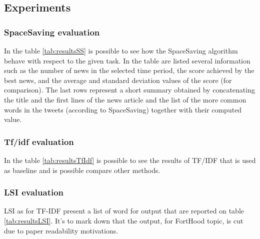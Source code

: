 \subsection*{Experiments}
\subsubsection*{SpaceSaving evaluation}
In the table \ref{tab:resultsSS} is possible to see how the SpaceSaving algorithm behave with respect to the given task.
In the table are listed several information such as the number of news in the selected time period, the score achieved by the best news, and the average and standard deviation values of the score (for comparison). The last rows represent a short summary obtained by concatenating the title and the first lines of the news article and the list of the more common words in the tweets (according to SpaceSaving) together with their computed value.

\subsubsection*{Tf/idf evaluation}
In the table \ref{tab:resultsTfIdf} is possible to see the results of TF/IDF that is used as baseline and is possible compare other methods.

\subsubsection*{LSI evaluation}
LSI as for TF-IDF present a list of word for output that are reported on table \ref{tab:resultsLSI}. It's to mark down that the output, for FortHood topic, is cut due to paper readability motivations.



